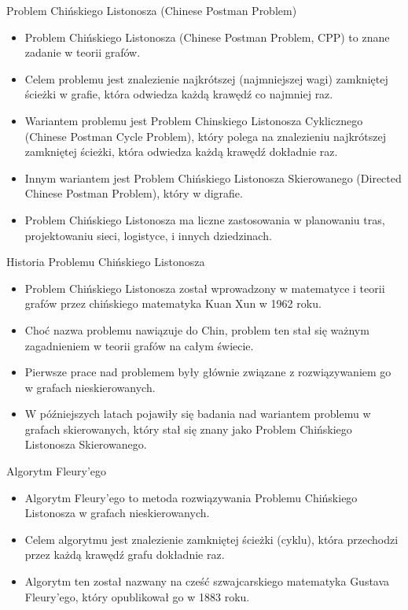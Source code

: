 \documentclass[polish,envcountsect,10pt]{beamer}
\begin{document}
\begin{frame}{Problem Chińskiego Listonosza (Chinese Postman Problem)}
    \begin{itemize}
        \item Problem Chińskiego Listonosza (Chinese Postman Problem, CPP) to znane zadanie w teorii grafów.
        \item Celem problemu jest znalezienie najkrótszej (najmniejszej wagi) zamkniętej ścieżki w grafie, która odwiedza każdą krawędź co najmniej raz.
        \item Wariantem problemu jest Problem Chinskiego Listonosza Cyklicznego (Chinese Postman Cycle Problem), który polega na znalezieniu najkrótszej zamkniętej ścieżki, która odwiedza każdą krawędź dokładnie raz.
        \item Innym wariantem jest Problem Chińskiego Listonosza Skierowanego (Directed Chinese Postman Problem), który w digrafie.
        \item Problem Chińskiego Listonosza ma liczne zastosowania w planowaniu tras, projektowaniu sieci, logistyce, i innych dziedzinach.
    \end{itemize}
\end{frame}

\begin{frame}{Historia Problemu Chińskiego Listonosza}
    \begin{itemize}
        \item Problem Chińskiego Listonosza został wprowadzony w matematyce i teorii grafów przez chińskiego matematyka Kuan Xun w 1962 roku.
        \item Choć nazwa problemu nawiązuje do Chin, problem ten stał się ważnym zagadnieniem w teorii grafów na całym świecie.
        \item Pierwsze prace nad problemem były głównie związane z rozwiązywaniem go w grafach nieskierowanych.
        \item W późniejszych latach pojawiły się badania nad wariantem problemu w grafach skierowanych, który stał się znany jako Problem Chińskiego Listonosza Skierowanego.
    \end{itemize}
\end{frame}

\begin{frame}{Algorytm Fleury'ego}
    \begin{itemize}
      \item Algorytm Fleury'ego to metoda rozwiązywania Problemu Chińskiego Listonosza w grafach nieskierowanych.
      \item Celem algorytmu jest znalezienie zamkniętej ścieżki (cyklu), która przechodzi przez każdą krawędź grafu dokładnie raz.
      \item Algorytm ten został nazwany na cześć szwajcarskiego matematyka Gustava Fleury'ego, który opublikował go w 1883 roku.
    \end{itemize}
\end{frame}
\end{document}
